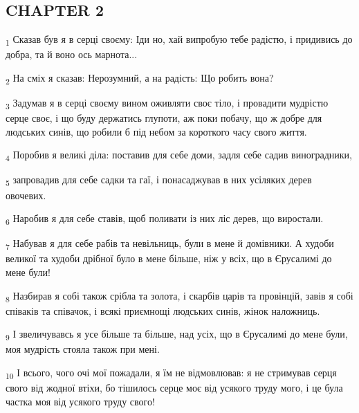 \subsection{CHAPTER 2}
\begin{tcolorbox}
\textsubscript{1} Сказав був я в серці своєму: Іди но, хай випробую тебе радістю, і придивись до добра, та й воно ось марнота...
\end{tcolorbox}
\begin{tcolorbox}
\textsubscript{2} На сміх я сказав: Нерозумний, а на радість: Що робить вона?
\end{tcolorbox}
\begin{tcolorbox}
\textsubscript{3} Задумав я в серці своєму вином оживляти своє тіло, і провадити мудрістю серце своє, і що буду держатись глупоти, аж поки побачу, що ж добре для людських синів, що робили б під небом за короткого часу свого життя.
\end{tcolorbox}
\begin{tcolorbox}
\textsubscript{4} Поробив я великі діла: поставив для себе доми, задля себе садив виноградники,
\end{tcolorbox}
\begin{tcolorbox}
\textsubscript{5} запровадив для себе садки та гаї, і понасаджував в них усіляких дерев овочевих.
\end{tcolorbox}
\begin{tcolorbox}
\textsubscript{6} Наробив я для себе ставів, щоб поливати із них ліс дерев, що виростали.
\end{tcolorbox}
\begin{tcolorbox}
\textsubscript{7} Набував я для себе рабів та невільниць, були в мене й домівники. А худоби великої та худоби дрібної було в мене більше, ніж у всіх, що в Єрусалимі до мене були!
\end{tcolorbox}
\begin{tcolorbox}
\textsubscript{8} Назбирав я собі також срібла та золота, і скарбів царів та провінцій, завів я собі співаків та співачок, і всякі приємнощі людських синів, жінок наложниць.
\end{tcolorbox}
\begin{tcolorbox}
\textsubscript{9} І звеличувавсь я усе більше та більше, над усіх, що в Єрусалимі до мене були, моя мудрість стояла також при мені.
\end{tcolorbox}
\begin{tcolorbox}
\textsubscript{10} І всього, чого очі мої пожадали, я їм не відмовлював: я не стримував серця свого від жодної втіхи, бо тішилось серце моє від усякого труду мого, і це була частка моя від усякого труду свого!
\end{tcolorbox}
